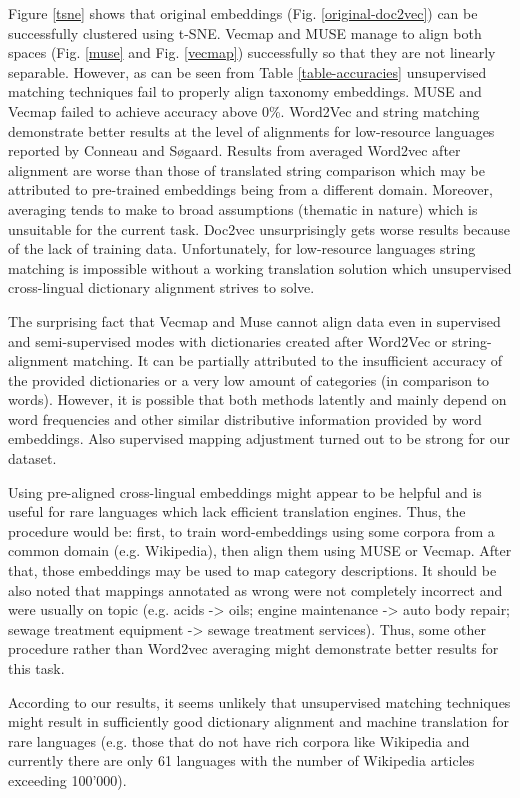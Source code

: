 \documentclass[11pt,a4paper]{article}
\begin{document}
Figure \ref{tsne} shows that original embeddings (Fig. \ref{original-doc2vec}) can be successfully clustered using t-SNE. Vecmap and MUSE manage to align both spaces (Fig. \ref{muse} and Fig. \ref{vecmap}) successfully so that they are not linearly separable. However, as can be seen from Table \ref{table-accuracies} unsupervised matching techniques fail to properly align taxonomy embeddings. MUSE and Vecmap failed to achieve accuracy above 0\%. Word2Vec and string matching demonstrate better results at the level of alignments for low-resource languages reported by Conneau and Søgaard. Results from averaged Word2vec after alignment are worse than those of translated string comparison which may be attributed to pre-trained embeddings being from a different domain. Moreover, averaging tends to make to broad assumptions (thematic in nature) which is unsuitable for the current task. Doc2vec unsurprisingly gets worse results because of the lack of training data. Unfortunately, for low-resource languages string matching is impossible without a working translation solution which unsupervised cross-lingual dictionary alignment strives to solve.

The surprising fact that Vecmap and Muse cannot align data even in supervised and semi-supervised modes with dictionaries created after Word2Vec or string-alignment matching. It can be partially attributed to the insufficient accuracy of the provided dictionaries or a very low amount of categories (in comparison to words). However, it is possible that both methods latently and mainly depend on word frequencies and other similar distributive information provided by word embeddings. Also supervised mapping adjustment turned out to be strong for our dataset.

Using pre-aligned cross-lingual embeddings might appear to be helpful and is useful for rare languages which lack efficient translation engines. Thus, the procedure would be: first, to train word-embeddings using some corpora from a common domain (e.g. Wikipedia), then align them using MUSE or Vecmap. After that, those embeddings may be used to map category descriptions. It should be also noted that mappings annotated as wrong were not completely incorrect and were usually on topic (e.g. acids -> oils; engine maintenance -> auto body repair; sewage treatment equipment -> sewage treatment services). Thus, some other procedure rather than Word2vec averaging might demonstrate better results for this task.

According to our results, it seems unlikely that unsupervised matching techniques might result in sufficiently good dictionary alignment and machine translation for rare languages (e.g. those that do not have rich corpora like  Wikipedia and currently there are only 61 languages with the number of Wikipedia articles exceeding 100'000).
\end{document}
